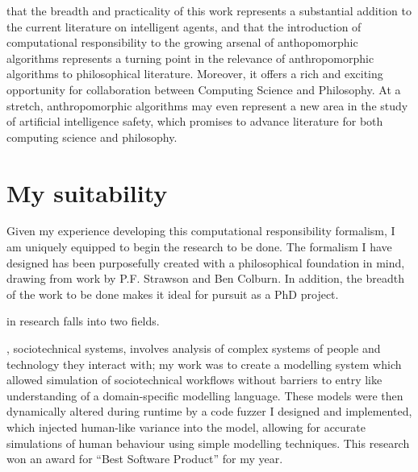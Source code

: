 \bigskip
{} that the breadth and practicality of this work represents a substantial addition to the current literature on intelligent agents, and that the introduction of computational responsibility to the growing arsenal of anthopomorphic algorithms represents a turning point in the relevance of anthropomorphic algorithms to philosophical literature. Moreover, it offers a rich and exciting opportunity for collaboration between Computing Science and Philosophy. At a stretch, anthropomorphic algorithms may even represent a new area in the study of artificial intelligence safety, which promises to advance literature for both computing science and philosophy.

\newpage
\section{My suitability}
Given my experience developing this computational responsibility formalism, I am uniquely equipped to begin the research to be done. The formalism I have designed has been purposefully created with a philosophical foundation in mind, drawing from work by P.F. Strawson\cite{freedomandresentment} and Ben Colburn. In addition, the breadth of the work to be done makes it ideal for pursuit as a PhD project.\par

\bigskip
 in research falls into two fields. \par

, sociotechnical systems, involves analysis of complex systems of people and technology they interact with; my work was to create a modelling system which allowed simulation of sociotechnical workflows without barriers to entry like understanding of a domain-specific modelling language. These models were then dynamically altered during runtime by a code fuzzer I designed and implemented, which injected human-like variance into the model, allowing for accurate simulations of human behaviour using simple modelling techniques. This research won an award for ``Best Software Product'' for my year.\par

